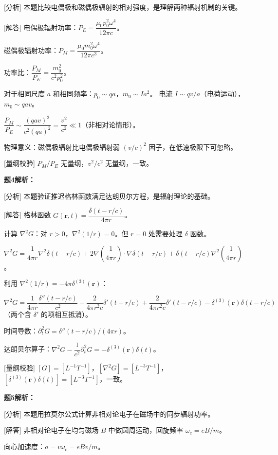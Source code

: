 \documentclass[11pt,a4paper,openany,oneside]{book}
\newcommand{\muz}{\mu_0}
\newcommand{\vect}[1]{\bm{#1}}
\newcommand{\grad}{\nabla}
\newcommand{\lap}{\nabla^2}
\begin{document}
[分析] 本题比较电偶极和磁偶极辐射的相对强度，是理解两种辐射机制的关键。

[解答] 电偶极辐射功率：$P_E = \dfrac{\muz p_0^2\omega^4}{12\pi c}$。

磁偶极辐射功率：$P_M = \dfrac{\muz m_0^2\omega^4}{12\pi c^3}$。

功率比：$\dfrac{P_M}{P_E} = \dfrac{m_0^2}{c^2 p_0^2}$。

对于相同尺度 $a$ 和相同频率：$p_0 \sim qa$，$m_0 \sim Ia^2$。
电流 $I \sim qv/a$（电荷运动），$m_0 \sim qa v$。

$\dfrac{P_M}{P_E} \sim \dfrac{(qav)^2}{c^2(qa)^2} = \dfrac{v^2}{c^2} \ll 1$（非相对论情形）。

物理意义：磁偶极辐射比电偶极辐射弱 $(v/c)^2$ 因子，在低速极限下可忽略。\qedsymbol

[量纲校验] $P_M/P_E$ 无量纲，$v^2/c^2$ 无量纲，一致。\qedsymbol

\textbf{题4解析：}

[分析] 本题验证推迟格林函数满足达朗贝尔方程，是辐射理论的基础。

[解答] 格林函数 $G(\vect{r},t) = \dfrac{\delta(t - r/c)}{4\pi r}$。

计算 $\lap G$：对 $r > 0$，$\lap(1/r) = 0$。但 $r = 0$ 处需要处理 $\delta$ 函数。

$\lap G = \dfrac{1}{4\pi r}\lap\delta(t - r/c) + 2\grad\left(\dfrac{1}{4\pi r}\right)\cdot\grad\delta(t - r/c) + \delta(t - r/c)\lap\left(\dfrac{1}{4\pi r}\right)$。

利用 $\lap(1/r) = -4\pi\delta^{(3)}(\vect{r})$：

$\lap G = \dfrac{1}{4\pi r}\dfrac{\delta''(t - r/c)}{c^2} - \dfrac{2}{4\pi r^2 c}\delta'(t - r/c) + \dfrac{2}{4\pi r^2 c}\delta'(t - r/c) - \delta^{(3)}(\vect{r})\delta(t - r/c)$（两个含 $\delta'$ 的项相互抵消）。

时间导数：$\partial_t^2 G = \delta''(t - r/c)/(4\pi r)$。

达朗贝尔算子：$\lap G - \dfrac{1}{c^2}\partial_t^2 G = -\delta^{(3)}(\vect{r})\delta(t)$。\qedsymbol

[量纲校验] $[G] = [L^{-1}T^{-1}]$，$[\lap G] = [L^{-3}T^{-1}]$，$[\delta^{(3)}(\vect{r})\delta(t)] = [L^{-3}T^{-1}]$，一致。\qedsymbol

\textbf{题5解析：}

[分析] 本题用拉莫尔公式计算非相对论电子在磁场中的同步辐射功率。

[解答] 非相对论电子在均匀磁场 $B$ 中做圆周运动，回旋频率 $\omega_c = eB/m$。

向心加速度：$a = v\omega_c = eBv/m$。
\end{document}
